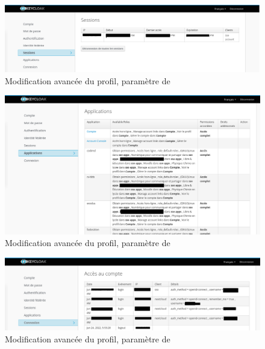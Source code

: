 \begin{figure}
	\centering
	\includegraphics{./Captures/keycloack.profil.sessions.png}
	\caption{Modification avancée du profil, paramètre de }
\end{figure}

\begin{figure}
	\centering
	\includegraphics{./Captures/keycloack.profil.applications.png}
	\caption{Modification avancée du profil, paramètre de }
\end{figure}

\begin{figure}
	\centering
	\includegraphics{./Captures/keycloack.profil.connexions.log.png}
	\caption{Modification avancée du profil, paramètre de }
\end{figure}